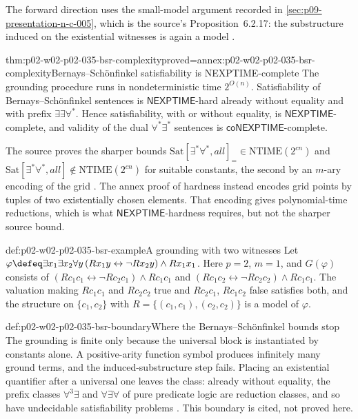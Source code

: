 The forward direction uses the small-model argument recorded in
\cref{sec:p09-presentation-n-c-005}, which is the source's
Proposition~6.2.17: the substructure induced on the existential witnesses is
again a model \cite[prop.~6.2.17]{BorgerGradelGurevich1997}.

\begin{hbtheorem}{thm:p02-w02-p02-035-bsr-complexity}{proved=annex:p02-w02-p02-035-bsr-complexity}{Bernays--Sch\"onfinkel satisfiability is NEXPTIME-complete}
The grounding procedure runs in nondeterministic time \(2^{O(n)}\).
Satisfiability of Bernays--Sch\"onfinkel sentences is
\(\mathsf{NEXPTIME}\)-hard already without equality and with prefix
\(\exists\exists\forall^{*}\).  Hence satisfiability, with or without
equality, is \(\mathsf{NEXPTIME}\)-complete, and validity of the dual
\(\forall^{*}\exists^{*}\) sentences is \(\mathsf{coNEXPTIME}\)-complete.
\end{hbtheorem}

The source proves the sharper bounds
\(\mathrm{Sat}[\exists^{*}\forall^{*},\mathit{all}]_{=}\in\mathrm{NTIME}(2^{cn})\)
and \(\mathrm{Sat}[\exists^{*}\forall^{*},\mathit{all}]\notin
\mathrm{NTIME}(2^{cn})\) for suitable constants, the second by an
\(m\)-ary encoding of the grid
\cite[thms.~6.2.19 and 6.2.21]{BorgerGradelGurevich1997}.  The annex proof of
hardness instead encodes grid points by tuples of two existentially chosen
elements.  That encoding gives polynomial-time reductions, which is what
\(\mathsf{NEXPTIME}\)-hardness requires, but not the sharper source bound.

\begin{hbexample}{def:p02-w02-p02-035-bsr-example}{A grounding with two witnesses}
Let \(\varphi\defeq\exists x_1\exists x_2\forall y\,
(Rx_1y\leftrightarrow\neg Rx_2y)\land Rx_1x_1\).  Here \(p=2\), \(m=1\), and
\(G(\varphi)\) consists of
\((Rc_1c_1\leftrightarrow\neg Rc_2c_1)\land Rc_1c_1\) and
\((Rc_1c_2\leftrightarrow\neg Rc_2c_2)\land Rc_1c_1\).  The valuation making
\(Rc_1c_1\) and \(Rc_2c_2\) true and \(Rc_2c_1\), \(Rc_1c_2\) false satisfies
both, and the structure on \(\{c_1,c_2\}\) with \(R=\{(c_1,c_1),(c_2,c_2)\}\)
is a model of \(\varphi\).
\end{hbexample}

\begin{hbwarning}{def:p02-w02-p02-035-bsr-boundary}{Where the Bernays--Sch\"onfinkel bounds stop}
The grounding is finite only because the universal block is instantiated by
constants alone.  A positive-arity function symbol produces infinitely many
ground terms, and the induced-substructure step fails.  Placing an existential
quantifier after a universal one leaves the class: already without equality,
the prefix classes \(\forall^{3}\exists\) and \(\forall\exists\forall\) of pure
predicate logic are reduction classes, and so have undecidable satisfiability
problems \cite[p.~311]{BorgerGradelGurevich1997}.  This boundary is cited, not
proved here.
\end{hbwarning}

